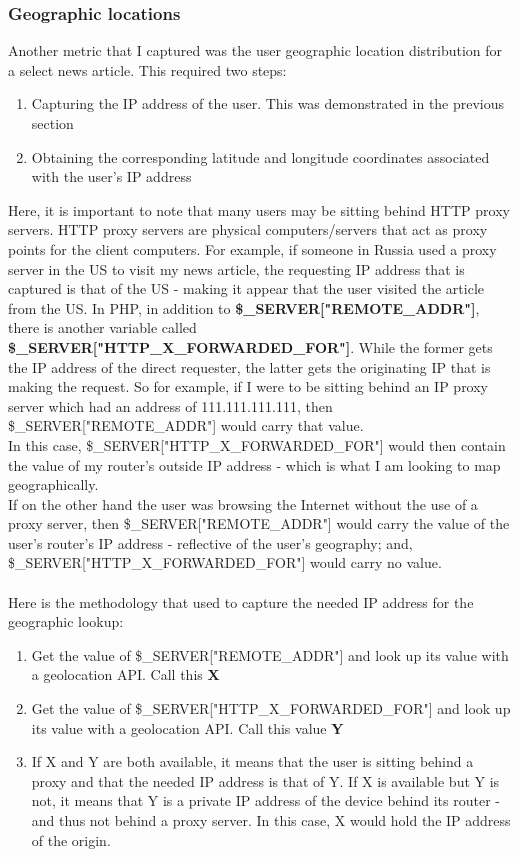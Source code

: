 \documentclass[12pt]{article}
\begin{document}
\newpage

\subsubsection{Geographic locations}
Another metric that I captured was the user geographic location distribution for a select news article. This required two steps:
\begin{enumerate}
\item Capturing the IP address of the user. This was demonstrated in the previous section
\item Obtaining the corresponding latitude and longitude coordinates associated with the user's IP address
\end{enumerate}

Here, it is important to note that many users may be sitting behind HTTP proxy servers. HTTP proxy servers are physical computers/servers that act as proxy points for the client computers. For example, if someone in Russia used a proxy server in the US to visit my news article, the requesting IP address that is captured is that of the US - making it appear that the user visited the article from the US. In PHP, in addition to \textbf{\$\_SERVER["REMOTE\_ADDR"]}, there is another variable called \\ \textbf{\$\_SERVER["HTTP\_X\_FORWARDED\_FOR"]}. While the former gets the IP address of the direct requester, the latter gets the originating IP that is making the request. So for example, if I were to be sitting behind an IP proxy server which had an address of 111.111.111.111, then \\ \$\_SERVER["REMOTE\_ADDR"] would carry that value. \\
In this case, \$\_SERVER["HTTP\_X\_FORWARDED\_FOR"] would then contain the value of my router's outside IP address - which is what I am looking to map geographically.   
\\ If on the other hand the user was browsing the Internet without the use of a proxy server, then \$\_SERVER["REMOTE\_ADDR"] would carry the value of the user's router's IP address - reflective of the user's geography; and, \$\_SERVER["HTTP\_X\_FORWARDED\_FOR"] would carry no value. \\ \\
\noindent Here is the methodology that used to capture the needed IP address for the geographic lookup:
\begin{enumerate}
\item Get the value of \$\_SERVER["REMOTE\_ADDR"] and look up its value with a geolocation API. Call this \textbf{X}
\item Get the value of \$\_SERVER["HTTP\_X\_FORWARDED\_FOR"] and look up its value with a geolocation API. Call this value \textbf{Y}
\item If X and Y are both available, it means that the user is sitting behind a proxy and that the needed IP address is that of Y. If X is available but Y is not, it means that Y is a private IP address of the device behind its router - and thus not behind a proxy server. In this case, X would hold the IP address of the origin.
\end{enumerate} 
\end{document}
